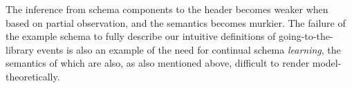 The inference from schema components to the header becomes weaker when based on partial observation, and the semantics becomes murkier. The failure of the example schema to fully describe our intuitive definitions of going-to-the-library events is also an example of the need for continual schema \textit{learning}, the semantics of which are also, as also mentioned above, difficult to render model-theoretically.
